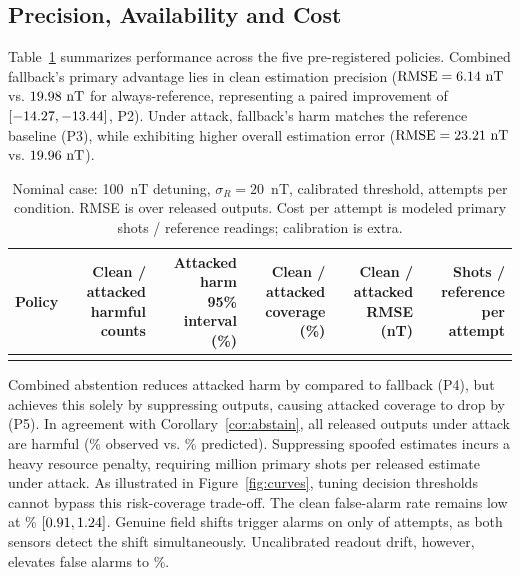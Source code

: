 \documentclass[conference]{IEEEtran}
\begin{document}
\subsection{Precision, Availability and Cost}
\label{sec:results-policies}

Table~\ref{tab:policies} summarizes performance across the five pre-registered policies. Combined fallback's primary advantage lies in clean estimation precision ($\text{RMSE} = 6.14\text{~nT}$ vs. $19.98\text{~nT}$ for always-reference, representing a paired improvement of \CleanDifference{} $[-14.27, -13.44]$, P2). Under attack, fallback's harm matches the reference baseline (P3), while exhibiting higher overall estimation error ($\text{RMSE} = 23.21\text{~nT}$ vs. $19.96\text{~nT}$).

\begin{table}[t]
\centering
\caption{Nominal case: 100~nT detuning, $\sigma_R=20$~nT, calibrated threshold, \TotalN{} attempts per condition. RMSE is over released outputs. Cost per attempt is modeled primary shots / reference readings; calibration is extra.}
\label{tab:policies}
\small
\setlength{\tabcolsep}{5pt}
\begin{tabular}{@{}lrrrrr@{}}
\toprule
Policy & \shortstack{Clean / attacked\\harmful counts} & \shortstack{Attacked harm\\95\% interval (\%)} & \shortstack{Clean / attacked\\coverage (\%)} & \shortstack{Clean / attacked\\RMSE (nT)} & \shortstack{Shots / reference\\per attempt} \\
\midrule

\\
\bottomrule
\end{tabular}
\end{table}

Combined abstention reduces attacked harm by \ObsPFourDiff{} compared to fallback (P4), but achieves this solely by suppressing outputs, causing attacked coverage to drop by \ObsPFiveDiff{} (P5). In agreement with Corollary~\ref{cor:abstain}, all \AbstainAttackH{} released outputs under attack are harmful (\TheoryAbstainObs\% observed vs. \TheoryAbstainPred\% predicted). Suppressing spoofed estimates incurs a heavy resource penalty, requiring \AbstainShotsMillions{} million primary shots per released estimate under attack. As illustrated in Figure~\ref{fig:curves}, tuning decision thresholds cannot bypass this risk-coverage trade-off. The clean false-alarm rate remains low at \CleanAlarmRate\% $[0.91, 1.24]$. Genuine field shifts trigger alarms on only \GenuineAlarmCount{} of \TotalN{} attempts, as both sensors detect the shift simultaneously. Uncalibrated readout drift, however, elevates false alarms to \MismatchAlarmRate\%.
\end{document}
